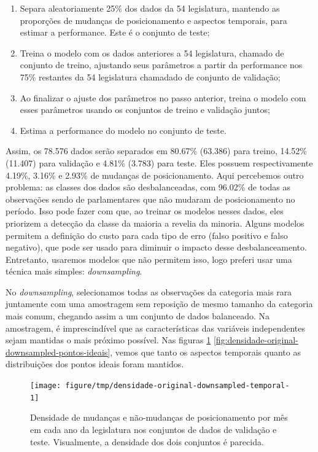 \documentclass[a4paper,titlepage]{ppgi}\usepackage[]{graphicx}\usepackage[]{color}
\newenvironment{knitrout}{}{} %
\begin{document}
\begin{enumerate}
\item Separa aleatoriamente 25\% dos dados da 54\textordfeminine{} legislatura,
mantendo as proporções de mudanças de posicionamento e aspectos temporais, para
estimar a performance. Este é o conjunto de teste;
\item Treina o modelo com os dados anteriores a 54\textordfeminine{}
legislatura, chamado de conjunto de treino, ajustando seus parâmetros a partir
da performance nos 75\% restantes da 54\textordfeminine{} legislatura chamadado
de conjunto de validação;
\item Ao finalizar o ajuste dos parâmetros no passo anterior, treina o modelo
com esses parâmetros usando os conjuntos de treino e validação juntos;
\item Estima a performance do modelo no conjunto de teste.
\end{enumerate}

Assim, os 78.576 dados serão separados em
80.67\%
(63.386) para treino,
14.52\%
(11.407) para validação e 4.81\% (3.783) para teste. Eles possuem respectivamente
4.19\%,
3.16\% e
2.93\% de mudanças de posicionamento.
Aqui percebemos outro problema: as classes dos dados são desbalanceadas, com
96.02\% de todas as observações sendo de
parlamentares que não mudaram de posicionamento no período. Isso pode fazer com
que, ao treinar os modelos nesses dados, eles priorizem a detecção da classe da
maioria a revelia da minoria. Alguns modelos permitem a definição do custo para
cada tipo de erro (falso positivo e falso negativo), que pode ser usado para
diminuir o impacto desse desbalanceamento. Entretanto, usaremos modelos que não
permitem isso, logo preferi usar uma técnica mais simples: \emph{downsampling}.

No \emph{downsampling}, selecionamos todas as observações da categoria mais
rara juntamente com uma amostragem sem reposição de mesmo tamanho da categoria
mais comum, chegando assim a um conjunto de dados balanceado. Na amostragem, é
imprescindível que as características das variáveis independentes sejam
mantidas o mais próximo possível. Nas figuras
\ref{fig:densidade-original-downsampled-temporal}
\ref{fig:densidade-original-downsampled-pontos-ideais}, vemos que tanto os
aspectos temporais quanto as distribuições dos pontos ideais foram mantidos.

\begin{knitrout}
\color{fgcolor}\begin{figure}
\texttt{[image: figure/tmp/densidade-original-downsampled-temporal-1]} \caption[Densidade de mudanças e não-mudanças de posicionamento por mês em cada ano da legislatura nos conjuntos de dados de validação e teste]{Densidade de mudanças e não-mudanças de posicionamento por mês em cada ano da legislatura nos conjuntos de dados de validação e teste. Visualmente, a densidade dos dois conjuntos é parecida.}\label{fig:densidade-original-downsampled-temporal}
\end{figure}


\end{knitrout}
\end{document}
